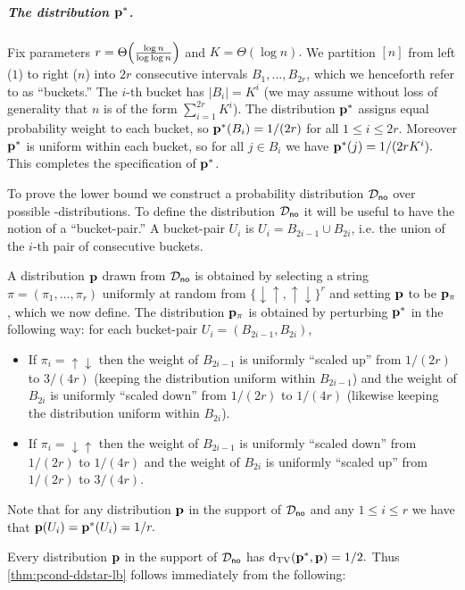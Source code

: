 \subparagraph{The distribution $\mathbf{p}^\ast$.}
Fix parameters $r = \bigTheta{\frac{\log n}{\log\log n}}$ and $K=\Theta(\log n).$
We partition $[n]$ from left ($1$) to right ($n$)
into $2r$ consecutive intervals $B_1,\dots,B_{2r}$, which we henceforth refer to as ``buckets.''  The $i$-th bucket has $|B_i|=K^i$ (we may assume without loss of generality that
$n$ is of the form $\sum_{i=1}^{2r} K^i$).
The distribution $\mathbf{p}^\ast$ assigns equal probability weight to each bucket, so
$\mathbf{p}^\ast(B_i)=1/(2r)$ for all $1 \leq i \leq 2r.$  Moreover $\mathbf{p}^\ast$ is uniform within each
bucket, so for all $j \in B_i$ we have $\mathbf{p}^\ast(j) = 1/(2r K^i).$  This completes
the specification of $\mathbf{p}^\ast$.

To prove the lower bound we construct
a probability distribution $\mathcal{D}_{\textsf{no}}$ over possible
\no-distributions.  To define the distribution $\mathcal{D}_{\textsf{no}}$
it will be useful to have
the notion of a ``bucket-pair.''  A bucket-pair $U_i$ is $U_i = B_{2i-1} \cup B_{2i}$, i.e. the
union of the $i$-th pair of consecutive buckets.

A distribution $\mathbf{p}$ drawn from $\mathcal{D}_{\textsf{no}}$ is obtained by
selecting a string $\pi=(\pi_1,\dots,\pi_r)$ uniformly at random
from $\{ \downarrow\uparrow, \uparrow\downarrow \}^r$
and setting $\mathbf{p}$ to be $\mathbf{p}_\pi$, which we now define.
The distribution $\mathbf{p}_\pi$ is obtained by perturbing $\mathbf{p}^\ast$ in the following
way:
for each bucket-pair $U_i=(B_{2i-1},B_{2i})$,

\begin{itemize}

\item If $\pi_i = \uparrow \downarrow$ then the weight of $B_{2i-1}$ is
uniformly ``scaled up'' from $1/(2r)$ to $3/(4r)$ (keeping the distribution
uniform within $B_{2i-1}$) and the weight of $B_{2i}$ is uniformly
``scaled down'' from $1/(2r)$ to $1/(4r)$ (likewise keeping the distribution
uniform within $B_{2i}$).

\item If $\pi_i = \downarrow \uparrow$ then the weight of $B_{2i-1}$ is uniformly ``scaled down'' from $1/(2r)$ to $1/(4r)$ and the weight of $B_{2i}$ is uniformly ``scaled up''
from $1/(2r)$ to $3/(4r)$.

\end{itemize}

Note that for any
distribution $\mathbf{p}$ in the support of $\mathcal{D}_{\textsf{no}}$
and any $1 \leq i \leq r$
we have that $\mathbf{p}(U_i)=\mathbf{p}^\ast(U_i)=1/r.$

Every distribution $\mathbf{p}$ in the support of $\mathcal{D}_{\textsf{no}}$
has $\operatorname{d}_{\rm{TV}}(\mathbf{p}^\ast,\mathbf{p}) = 1/2.$  Thus
\cref{thm:pcond-ddstar-lb} follows immediately from the following:

